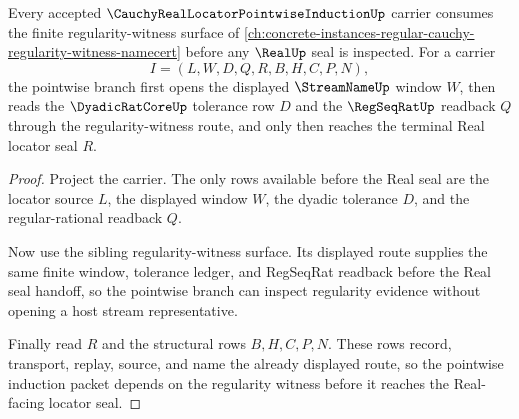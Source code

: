 \begin{theorem}
\label{thm:cauchy-real-locator-pointwise-induction-regularity-witness-route}
Every accepted $\CauchyRealLocatorPointwiseInductionUp$ carrier consumes the
finite regularity-witness surface of
\autoref{ch:concrete-instances-regular-cauchy-regularity-witness-namecert}
before any $\RealUp$ seal is inspected. For a carrier
$$
I=(L,W,D,Q,R,B,H,C,P,N),
$$
the pointwise branch first opens the displayed $\StreamNameUp$ window $W$,
then reads the $\DyadicRatCoreUp$ tolerance row $D$ and the $\RegSeqRatUp$
readback $Q$ through the regularity-witness route, and only then reaches the
terminal Real locator seal $R$.
\end{theorem}
\begin{proof}
Project the carrier. The only rows available before the Real seal are the
locator source $L$, the displayed window $W$, the dyadic tolerance $D$, and
the regular-rational readback $Q$.

Now use the sibling regularity-witness surface. Its displayed route supplies
the same finite window, tolerance ledger, and RegSeqRat readback before the
Real seal handoff, so the pointwise branch can inspect regularity evidence
without opening a host stream representative.

Finally read $R$ and the structural rows $B,H,C,P,N$. These rows record,
transport, replay, source, and name the already displayed route, so the
pointwise induction packet depends on the regularity witness before it reaches
the Real-facing locator seal.
\end{proof}

